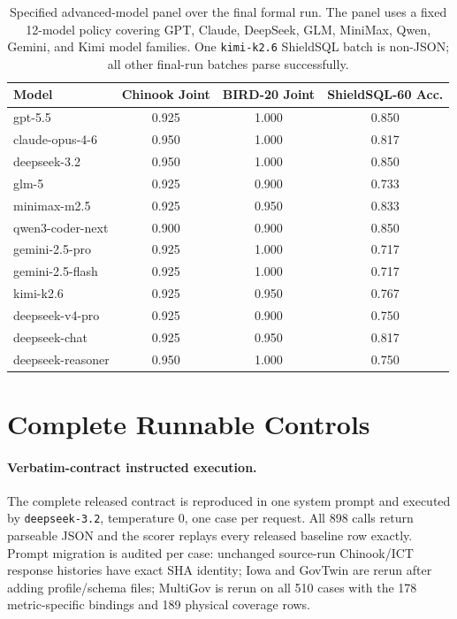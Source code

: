 \documentclass[letterpaper]{article}
\begin{document}
\begin{table}[h]
\centering
\scriptsize
\begin{tabular}{lccc}
\toprule
Model & Chinook Joint & BIRD-20 Joint & ShieldSQL-60 Acc. \\
\midrule
gpt-5.5 & 0.925 & 1.000 & 0.850 \\
claude-opus-4-6 & 0.950 & 1.000 & 0.817 \\
deepseek-3.2 & 0.950 & 1.000 & 0.850 \\
glm-5 & 0.925 & 0.900 & 0.733 \\
minimax-m2.5 & 0.925 & 0.950 & 0.833 \\
qwen3-coder-next & 0.900 & 0.900 & 0.850 \\
gemini-2.5-pro & 0.925 & 1.000 & 0.717 \\
gemini-2.5-flash & 0.925 & 1.000 & 0.717 \\
kimi-k2.6 & 0.925 & 0.950 & 0.767 \\
deepseek-v4-pro & 0.925 & 0.900 & 0.750 \\
deepseek-chat & 0.925 & 0.950 & 0.817 \\
deepseek-reasoner & 0.950 & 1.000 & 0.750 \\
\bottomrule
\end{tabular}
\caption{Specified advanced-model panel over the final formal run. The panel uses a fixed 12-model policy covering GPT, Claude, DeepSeek, GLM, MiniMax, Qwen, Gemini, and Kimi model families. One \texttt{kimi-k2.6} ShieldSQL batch is non-JSON; all other final-run batches parse successfully.}
\end{table}

\section{Complete Runnable Controls}

\paragraph{Verbatim-contract instructed execution.}
The complete released contract is reproduced in one system prompt and executed by \texttt{deepseek-3.2}, temperature 0, one case per request. All 898 calls return parseable JSON and the scorer replays every released baseline row exactly. Prompt migration is audited per case: unchanged source-run Chinook/ICT response histories have exact SHA identity; Iowa and GovTwin are rerun after adding profile/schema files; MultiGov is rerun on all 510 cases with the 178 metric-specific bindings and 189 physical coverage rows.
\end{document}
